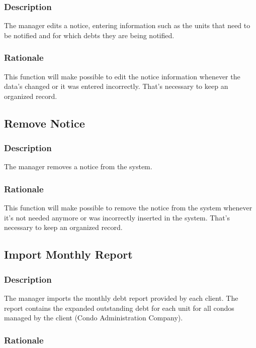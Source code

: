 \documentclass{scrreprt}
\begin{document}
\subsubsection{Description}

The manager edits a notice, entering information such as the units that need to be notified and for which debts they are being notified.

\subsubsection{Rationale}

This function will make possible to edit the notice information whenever the data's changed or it was entered incorrectly. That's necessary to keep an organized record.

\subsection{Remove Notice}
\subsubsection{Description}

The manager removes a notice from the system.

\subsubsection{Rationale}

This function will make possible to remove the notice from the system whenever it's not needed anymore or was incorrectly inserted in the system. That's necessary to keep an organized record.

\subsection{Import Monthly Report}
\subsubsection{Description}

The manager imports the monthly debt report provided by each client. The report contains the expanded outstanding debt for each unit for all condos managed by the client (Condo Administration Company).

\subsubsection{Rationale}
\end{document}

